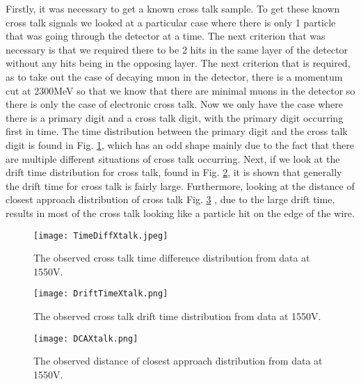 \documentclass[./Thesis]{subfiles}
\begin{document}
	Firstly, it was necessary to get a known cross talk sample. To get these known cross talk signals we looked at a particular case where there is only 1 particle that was going through the detector at a time. The next criterion that was necessary is that we required there to be 2 hits in the same layer of the detector without any hits being in the opposing layer. The next criterion that is required, as to take out the case of decaying muon in the detector, there is a momentum cut at 2300MeV so that we know that there are minimal muons in the detector so there is only the case of electronic cross talk. Now we only have the case where there is a primary digit and a cross talk digit, with the primary digit occurring first in time. The time distribution between the primary digit and the cross talk digit is found in Fig. \ref{fig:TimeXtalk}, which has an odd shape mainly due to the fact that there are multiple different situations of cross talk occurring. Next, if we look at the drift time distribution for cross talk, found in Fig. \ref{fig:DriftXtalk}, it is shown that generally the drift time for cross talk is fairly large. Furthermore, looking at the distance of closest approach distribution of cross talk Fig. \ref{fig:DCAXtalk} , due to the large drift time, results in most of the cross talk looking like a particle hit on the edge of the wire. 
	
\begin{figure}
	\centerline{\texttt{[image: TimeDiffXtalk.jpeg]}}
	\caption[ Cross Talk Time Distribution]{ The observed cross talk time difference distribution from data at 1550V.}
	\label{fig:TimeXtalk}
\end{figure}

\begin{figure}
	\centerline{\texttt{[image: DriftTimeXtalk.png]}}
	\caption[ DriftTime Distribution of Cross Talk]{ The observed cross talk drift time distribution from data at 1550V.}
	\label{fig:DriftXtalk}
\end{figure}
	
\begin{figure}
	\centerline{\texttt{[image: DCAXtalk.png]}}
	\caption[ Distance of Closest Approach Distribution of Cross Talk]{ The observed distance of closest approach distribution from data at 1550V.}
	\label{fig:DCAXtalk}
\end{figure}
	
\end{document}
